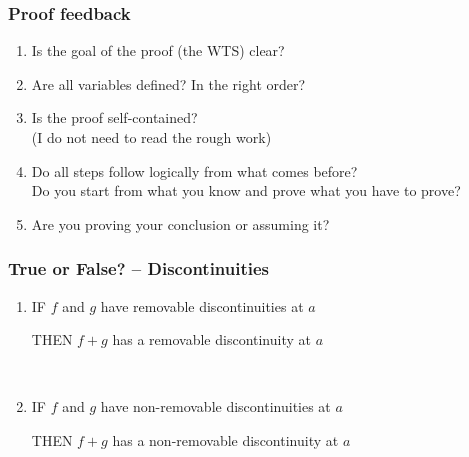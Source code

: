 \documentclass[14pt]{beamer}
\begin{document}
\begin{frame}[t]
\frametitle{Proof feedback}

\begin{enumerate}
	\item  Is the goal of the proof (the WTS) clear?
	\item  Are all variables defined?  In the right order? 
	\item  Is the proof self-contained?  \\
	 (I do not need to read the rough work)
	\item  Do all steps follow logically from what comes before? \\
	Do you start from what you know and prove what you have to prove? \\
	\item  Are you proving your conclusion or assuming it?
\end{enumerate}
\end{frame}


\begin{frame}
\frametitle{True or False? -- Discontinuities}

	\begin{enumerate}
		\item IF $f$ and $g$ have removable discontinuities at $a$
		
			THEN  $f+g$ has a removable discontinuity at $a$
		
		\
		\item IF $f$ and $g$ have non-removable discontinuities at $a$
		
			THEN $f+g$ has a non-removable discontinuity at $a$
	\end{enumerate}


\end{frame}
\end{document}
